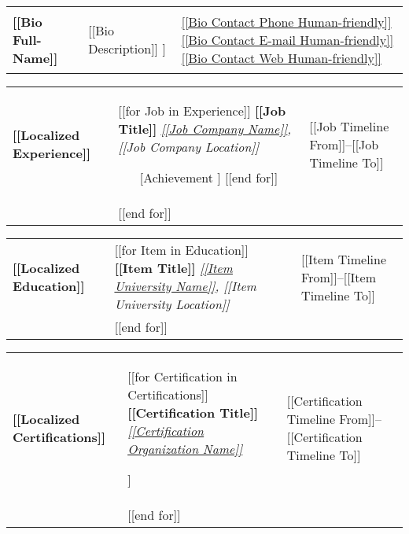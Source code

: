\documentclass[11pt, a4paper]{article}
\begin{document}
\begin{tabularx}{\textwidth}{m{50mm} m{95mm} m{50mm}}
    {\huge\textbf{[[Bio Full-Name]]}} \newline &
    \begin{center}
    [[Bio Description]] \newline
    [[Bio Location]] \newline
    \end{center} &
    {\small \underline{\href{[[Bio Contact Phone URI]]}{[[Bio Contact Phone Human-friendly]]}}} \newline
    {\small \underline{\href{[[Bio Contact E-mail URI]]}{[[Bio Contact E-mail Human-friendly]]}}} \newline
    {\small \underline{\href{[[Bio Contact Web URI]]}{[[Bio Contact Web Human-friendly]]}}} \newline
\end{tabularx}

\begin{tabularx}{\textwidth}{p{20mm} p{125mm} p{50mm}}
    \textbf{[[Localized Experience]]} &
    [[for Job in Experience]]
        \textbf{[[Job Title]]} \newline
        \textit{\underline{\href{[[Job Company URI]]}{[[Job Company Name]]}}, [[Job Company Location]]}
        \begin{itemize}[leftmargin=*]
        [[for Achievement in Job Achievements]]
            \item [[Achievement]]
        [[end for]]
        \end{itemize} &
        {\small [[Job Timeline From]]--[[Job Timeline To]]} \\ &
    [[end for]]
\end{tabularx}

\begin{tabularx}{\textwidth}{p{20mm} p{125mm} p{50mm}}
    \textbf{[[Localized Education]]} &
    [[for Item in Education]]
        \textbf{[[Item Title]]} \newline
        \textit{\underline{\href{[[Item University URI]]}{[[Item University Name]]}}, [[Item University Location]]} \newline &
        {\small [[Item Timeline From]]--[[Item Timeline To]]} \\ &
    [[end for]]
\end{tabularx}

\begin{tabularx}{\textwidth}{p{20mm} p{125mm} p{50mm}}
    \textbf{[[Localized Certifications]]} &
    [[for Certification in Certifications]]
        \textbf{[[Certification Title]]} \newline
        \textit{\underline{\href{[[Certification Organization URI]]}{[[Certification Organization Name]]}}}
        \begin{flushleft}
        [[Certification Description]]
        \end{flushleft} &
        {\small [[Certification Timeline From]]--[[Certification Timeline To]]} \\ &
    [[end for]]
\end{tabularx}
\end{document}
